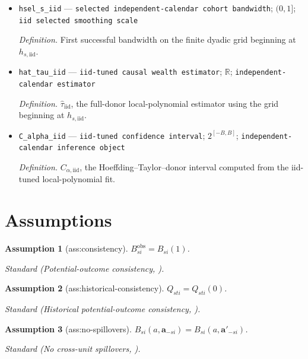 \documentclass{article}
\newtheorem{assumption}{Assumption}
\begin{document}
\begin{itemize}
  \item \texttt{hsel\_\allowbreak{}s\_\allowbreak{}iid} --- \texttt{selected independent-\allowbreak{}calendar cohort bandwidth}; \((0,1]\); \texttt{iid selected smoothing scale}
  \par\smallskip\noindent\emph{Definition.} First successful bandwidth on the finite dyadic grid beginning at \(h_{s,\mathrm{iid}}\).
  \item \texttt{hat\_\allowbreak{}tau\_\allowbreak{}iid} --- \texttt{iid-\allowbreak{}tuned causal wealth estimator}; \(\mathbb R\); \texttt{independent-\allowbreak{}calendar estimator}
  \par\smallskip\noindent\emph{Definition.} \(\widehat\tau_{\mathrm{iid}}\), the full-donor local-polynomial estimator using the grid beginning at \(h_{s,\mathrm{iid}}\).
  \item \texttt{C\_\allowbreak{}alpha\_\allowbreak{}iid} --- \texttt{iid-\allowbreak{}tuned confidence interval}; \(2^{[-B,B]}\); \texttt{independent-\allowbreak{}calendar inference object}
  \par\smallskip\noindent\emph{Definition.} \(C_{\alpha,\mathrm{iid}}\), the Hoeffding--Taylor--donor interval computed from the iid-tuned local-polynomial fit.
\end{itemize}

\section{Assumptions}

\begin{assumption}[ass:consistency]\label{ass:consistency}
\(B_{si}^{\mathrm{obs}}=B_{si}(1)\).
\par\smallskip\noindent\emph{Standard} (Potential-outcome consistency, \cite{GoldsmithPinkhamLyu2025}).
\end{assumption}

\begin{assumption}[ass:historical-consistency]\label{ass:historical-consistency}
\(Q_{sti}=Q_{sti}(0)\).
\par\smallskip\noindent\emph{Standard} (Historical potential-outcome consistency, \cite{GoldsmithPinkhamLyu2025}).
\end{assumption}

\begin{assumption}[ass:no-spillovers]\label{ass:no-spillovers}
\(B_{si}(a,\mathbf a_{-si})=B_{si}(a,\mathbf a'_{-si})\).
\par\smallskip\noindent\emph{Standard} (No cross-unit spillovers, \cite{GoldsmithPinkhamLyu2025}).
\end{assumption}
\end{document}
